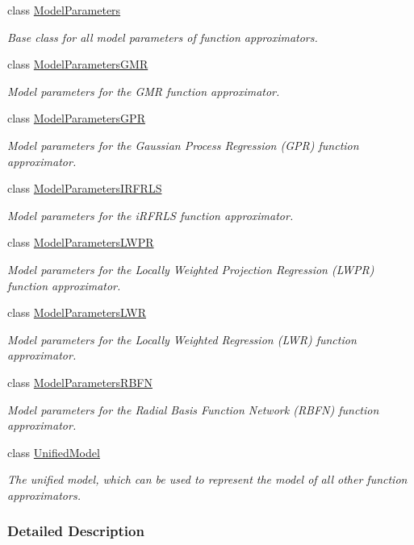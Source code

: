 \begin{DoxyCompactItemize}
class \hyperlink{classDmpBbo_1_1ModelParameters}{Model\+Parameters}
\begin{DoxyCompactList}\small\item\em Base class for all model parameters of function approximators. \end{DoxyCompactList}\item 
class \hyperlink{classDmpBbo_1_1ModelParametersGMR}{Model\+Parameters\+G\+M\+R}
\begin{DoxyCompactList}\small\item\em Model parameters for the G\+M\+R function approximator. \end{DoxyCompactList}\item 
class \hyperlink{classDmpBbo_1_1ModelParametersGPR}{Model\+Parameters\+G\+P\+R}
\begin{DoxyCompactList}\small\item\em Model parameters for the Gaussian Process Regression (G\+P\+R) function approximator. \end{DoxyCompactList}\item 
class \hyperlink{classDmpBbo_1_1ModelParametersIRFRLS}{Model\+Parameters\+I\+R\+F\+R\+L\+S}
\begin{DoxyCompactList}\small\item\em Model parameters for the i\+R\+F\+R\+L\+S function approximator. \end{DoxyCompactList}\item 
class \hyperlink{classDmpBbo_1_1ModelParametersLWPR}{Model\+Parameters\+L\+W\+P\+R}
\begin{DoxyCompactList}\small\item\em Model parameters for the Locally Weighted Projection Regression (L\+W\+P\+R) function approximator. \end{DoxyCompactList}\item 
class \hyperlink{classDmpBbo_1_1ModelParametersLWR}{Model\+Parameters\+L\+W\+R}
\begin{DoxyCompactList}\small\item\em Model parameters for the Locally Weighted Regression (L\+W\+R) function approximator. \end{DoxyCompactList}\item 
class \hyperlink{classDmpBbo_1_1ModelParametersRBFN}{Model\+Parameters\+R\+B\+F\+N}
\begin{DoxyCompactList}\small\item\em Model parameters for the Radial Basis Function Network (R\+B\+F\+N) function approximator. \end{DoxyCompactList}\item 
class \hyperlink{classDmpBbo_1_1UnifiedModel}{Unified\+Model}
\begin{DoxyCompactList}\small\item\em The unified model, which can be used to represent the model of all other function approximators. \end{DoxyCompactList}\end{DoxyCompactItemize}


\subsubsection{Detailed Description}
